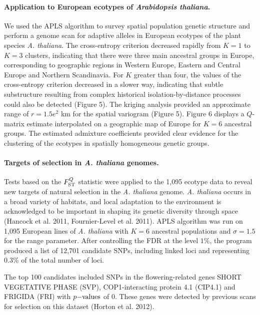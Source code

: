  
\paragraph{Application to European ecotypes of {\it Arabidopsis  thaliana}.} We used  the APLS algorithm to survey spatial population genetic structure and perform a genome scan for adaptive alleles in European ecotypes of the plant species {\it A.  thaliana}. The cross-entropy criterion decreased rapidly from $K=1$ to $K=3$ clusters,  indicating  that  there were three 
main ancestral groups in Europe, corresponding to geographic regions in Western Europe, Eastern and Central Europe and Northern Scandinavia. For $K$ greater than four, the values of the cross-entropy criterion decreased in a slower way, indicating that subtle substructure resulting from complex historical isolation-by-distance  processes could also be detected (Figure 5). 
The kriging analysis provided an approximate range of  $r = 1.5e^2$ km for the spatial variogram (Figure 5).
Figure 6 displays a $Q$-matrix estimate  interpolated on a geographic map of Europe for $K = 6$ ancestral groups. The estimated admixture coefficients provided clear evidence for the clustering of the ecotypes in spatially homogeneous genetic groups. 

\paragraph{Targets of selection in {\it A.  thaliana} genomes.}  Tests based on the $F^Q_{\rm ST}$  statistic were applied to the 1,095 ecotype data to reveal new targets of natural selection in the {\it A. thaliana} genome. {\it A. thaliana} occurs in a broad variety of habitats, and local adaptation to the environment is acknowledged to be important in shaping its genetic diversity through space (Hancock et al. 2011, Fournier-Level et al. 2011). 
APLS algorithm was run on 1,095 European lines of {\it A. thaliana} with $K=6$ ancestral populations and $\sigma = 1.5$ for the range parameter. After controlling the FDR at the level $1\%$, the program produced a list of 12,701 candidate SNPs, including linked loci and representing 0.3\% of the total number of loci. 
 
 The top 100 candidates included SNPs in the flowering-related genes SHORT VEGETATIVE PHASE (SVP), COP1-interacting protein 4.1 (CIP4.1) and FRIGIDA (FRI) with $p{\rm -values}$ of 0. 
 These genes were detected by previous scans for selection on this dataset (Horton et al. 2012).
 
